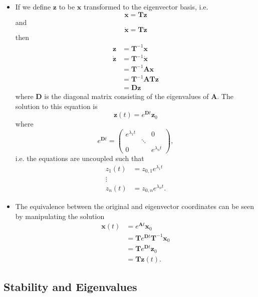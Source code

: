 \documentclass{article}
\renewcommand{\vec}[1]{\boldsymbol{\mathbf{#1}}}
\newcommand{\dvec}[1]{\dot{\vec{#1}}}
\begin{document}
\begin{itemize}
  \item If we define $\vec{z}$ to be $\vec{x}$ transformed to the eigenvector basis, i.e. \[\vec{x} = \vec{T} \vec{z}\] and \[\dvec{x} = \vec{T} \dvec{z}\] then \begin{align*}
          \vec{z}  & = \vec{T}^{-1} \vec{x}                 \\
          \dvec{z} & = \vec{T}^{-1} \dvec{x}                \\
                   & = \vec{T}^{-1} \vec{A} \vec{x}         \\
                   & = \vec{T}^{-1} \vec{A} \vec{T} \vec{z} \\
                   & = \vec{D} \vec{z}
        \end{align*} where $\vec{D}$ is the diagonal matrix consisting of the eigenvalues of $\vec{A}$. The solution to this equation is \[\vec{z}(t) = e^{\vec{D} t} \vec{z}_0\] where \[e^{\vec{D} t} = \begin{pmatrix}
            e^{\lambda_1 t} &        & 0               \\
                            & \ddots &                 \\
            0               &        & e^{\lambda_n t}
          \end{pmatrix},\] i.e. the equations are uncoupled such that \begin{align*}
          z_1(t) & = z_{0,1} e^{\lambda_1 t}  \\
          \vdots                              \\
          z_n(t) & = z_{0,n} e^{\lambda_n t}.
        \end{align*}

  \item The equivalence between the original and eigenvector coordinates can be seen by manipulating the solution \begin{align*}
          \vec{x}(t) & = e^{\vec{A} t} \vec{x}_0                      \\
                     & = \vec{T} e^{\vec{D} t} \vec{T}^{-1} \vec{x}_0 \\
                     & = \vec{T} e^{\vec{D} t} \vec{z}_0              \\
                     & = \vec{T} \vec{z}(t).
        \end{align*}
\end{itemize}

\subsection{Stability and Eigenvalues}
\end{document}

